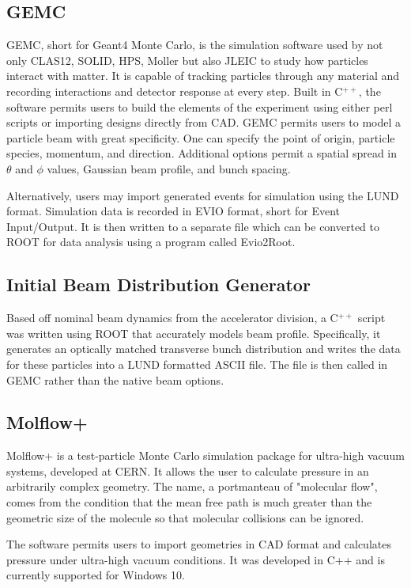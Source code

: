 \subsection{GEMC}

GEMC, short for Geant4 Monte Carlo, is the simulation software used by not only CLAS12, SOLID, HPS, Moller but also JLEIC to study how particles interact with matter.  It is capable of tracking particles through any material and recording interactions and detector response at every step.  Built in C$^{++}$, the software permits users to build the elements of the experiment using either perl scripts or importing designs directly from CAD.  GEMC permits users to model a particle beam with great specificity.  One can specify the point of origin, particle species, momentum, and direction.  Additional options permit a spatial spread in $\theta$ and $\phi$ values, Gaussian beam profile, and bunch spacing. 

Alternatively, users may import generated events for simulation using the LUND format.  Simulation data is recorded in EVIO format, short for Event Input/Output.  It is then written to a separate file which can be converted to ROOT for data analysis using a program called Evio2Root.

\subsection{Initial Beam Distribution Generator}
Based off nominal beam dynamics from the accelerator division, a C$^{++}$ script was written using ROOT that accurately models beam profile.  Specifically, it generates an optically matched transverse bunch distribution and writes the data for these particles into a LUND formatted ASCII file.  The file is then called in GEMC rather than the native beam options.  
  

\subsection{Molflow+}

Molflow+ is a test-particle Monte Carlo simulation package for ultra-high vacuum systems, developed at CERN.  It allows the user to calculate pressure in an arbitrarily complex geometry.  The name, a portmanteau of "molecular flow", comes from the condition that the mean free path is much greater than the geometric size of the molecule so that molecular collisions can be ignored.

The software permits users to import geometries in CAD format and calculates pressure under ultra-high vacuum conditions. It was developed in C++ and is currently supported for Windows 10.

